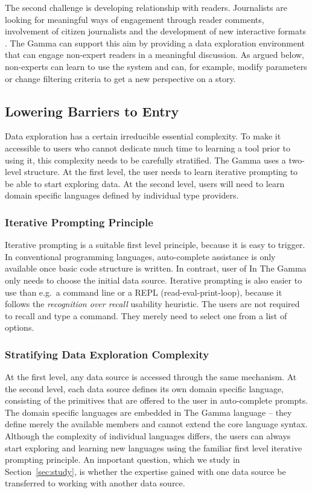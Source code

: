 \documentclass[manuscript,review,anonymous]{acmart}
\begin{document}
The second challenge is developing relationship with readers. Journalists are looking
for meaningful ways of engagement through reader comments, involvement of citizen journalists
\cite{comments,citizen} and the development of new interactive formats \cite{youdraw}.
The Gamma can support this aim by providing a data exploration environment that can engage
non-expert readers in a meaningful discussion. As argued below, non-experts can learn to use the
system and can, for example, modify parameters or change filtering criteria to get a
new perspective on a story.

\subsection{Lowering Barriers to Entry}
\label{sec:design-bar}

Data exploration has a certain irreducible essential complexity. To make it accessible to users who
cannot dedicate much time to learning a tool prior to using it, this complexity needs to be
carefully stratified. The Gamma uses a two-level structure. At the first level, the user needs
to learn iterative prompting to be able to start exploring data. At the second level, users will
need to learn domain specific languages defined by individual type providers.

\subsubsection*{Iterative Prompting Principle}
Iterative prompting is a suitable first level principle, because it is easy to trigger.
In conventional programming languages, auto-complete assistance is only available once basic
code structure is written. In contrast, user of In The Gamma only needs to choose the initial
data source. Iterative prompting is also easier to use than e.g.~a command line or a REPL
(read-eval-print-loop), because it follows the \emph{recognition over recall} usability heuristic.
The users are not required to recall and type a command. They merely need to select one from a
list of options.

\subsubsection*{Stratifying Data Exploration Complexity}
At the first level, any data source is accessed through the same mechanism. At the second level,
each data source defines its own domain specific language, consisting of the primitives that are
offered to the user in auto-complete prompts. The domain specific languages are embedded in The Gamma
language -- they define merely the available members and cannot extend the core language syntax.
Although the complexity of individual languages differs, the users can always start exploring
and learning new languages using the familiar first level iterative prompting principle.
An important question, which we study in Section~\ref{sec:study}, is whether the expertise gained
with one data source be transferred to working with another data source.
\end{document}
